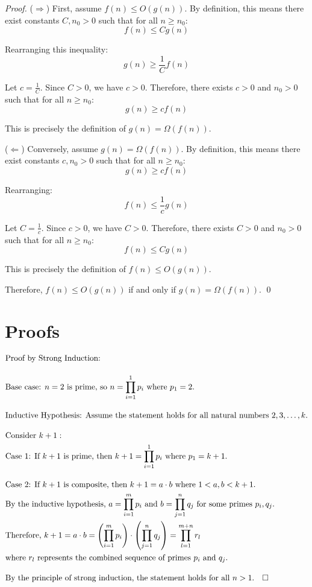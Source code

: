 \documentclass{article}
\theoremstyle{definition}
\begin{document}
\begin{proof}
($\Rightarrow$) First, assume $f(n) \leq O(g(n))$. By definition, this means there exist constants $C, n_0 > 0$ such that for all $n \geq n_0$:
\[ f(n) \leq Cg(n) \]

Rearranging this inequality:
\[ g(n) \geq \frac{1}{C}f(n) \]

Let $c = \frac{1}{C}$. Since $C > 0$, we have $c > 0$. Therefore, there exists $c > 0$ and $n_0 > 0$ such that for all $n \geq n_0$:
\[ g(n) \geq cf(n) \]

This is precisely the definition of $g(n) = \Omega(f(n))$.

($\Leftarrow$) Conversely, assume $g(n) = \Omega(f(n))$. By definition, this means there exist constants $c, n_0 > 0$ such that for all $n \geq n_0$:
\[ g(n) \geq cf(n) \]

Rearranging:
\[ f(n) \leq \frac{1}{c}g(n) \]

Let $C = \frac{1}{c}$. Since $c > 0$, we have $C > 0$. Therefore, there exists $C > 0$ and $n_0 > 0$ such that for all $n \geq n_0$:
\[ f(n) \leq Cg(n) \]

This is precisely the definition of $f(n) \leq O(g(n))$.

Therefore, $f(n) \leq O(g(n))$ if and only if $g(n) = \Omega(f(n))$. \qed
\end{proof}

\section{Proofs}


    \begin{align}
        &\text{Proof by Strong Induction:} \notag \\[1em]
        &\text{Base case: } n = 2 \text{ is prime, so } n = \prod_{i=1}^1 p_i \text{ where } p_1 = 2. \notag \\[1em]
        &\text{Inductive Hypothesis: Assume the statement holds for all natural numbers } 2,3,\ldots,k. \notag \\[1em]
        &\text{Consider } k+1: \notag \\
        &\text{Case 1: If } k+1 \text{ is prime, then } k+1 = \prod_{i=1}^1 p_i \text{ where } p_1 = k+1. \notag \\[1em]
        &\text{Case 2: If } k+1 \text{ is composite, then } k+1 = a \cdot b \text{ where } 1 < a,b < k+1. \notag \\
        &\text{By the inductive hypothesis, } a = \prod_{i=1}^m p_i \text{ and } b = \prod_{j=1}^n q_j \text{ for some primes } p_i, q_j. \notag \\
        &\text{Therefore, } k+1 = a \cdot b = \left(\prod_{i=1}^m p_i\right) \cdot \left(\prod_{j=1}^n q_j\right) = \prod_{l=1}^{m+n} r_l \notag \\
        &\text{where } r_l \text{ represents the combined sequence of primes } p_i \text{ and } q_j. \notag \\[1em]
        &\text{By the principle of strong induction, the statement holds for all } n > 1. \quad \square \notag
    \end{align}
    
\end{document}
